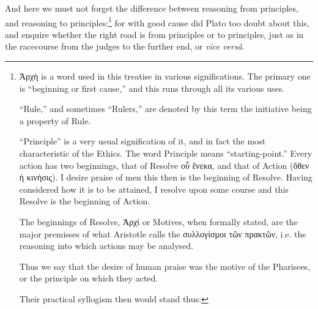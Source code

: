 And here we must not forget the difference between reasoning from principles,
and reasoning to principles:\footnote{Ἀρχὴ is a word used in this treatise in various
significations. The primary one is “beginning or first cause,” and
this runs through all its various uses.

“Rule,” and sometimes “Rulers,” are denoted by this
term the initiative being a property of Rule.

“Principle” is a very usual signification of it, and in fact the
most characteristic of the Ethics. The word Principle means
“starting-point.” Every action has two beginnings, that of Resolve
οὗ ἕνεκα, and that of Action
(ὅθεν ἡ κινήσις).
I desire praise of men this then is the beginning of Resolve. Having considered
how it is to be attained, I resolve upon some course and this Resolve is the
beginning of Action.

The beginnings of Resolve, Ἀρχὶ or Motives, when
formally stated, are the major premisses of what Aristotle calls the
συλλογίσμοι
τῶν πρακτῶν, i.e. the
reasoning into which actions may be analysed.

Thus we say that the desire of human praise was the motive of the
Pharisees, or the principle on which they acted.

Their practical syllogism then would stand thus:}
for with good cause did Plato too doubt about this, and enquire whether the
right road is from principles or to principles, just as in the racecourse from
the judges to the further end, or \emph{vice versâ}.

